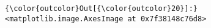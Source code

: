 \documentclass[11pt]{article}
\begin{document}
\begin{Verbatim}[commandchars=\\\{\}]
{\color{outcolor}Out[{\color{outcolor}20}]:} <matplotlib.image.AxesImage at 0x7f38148c76d8>
\end{Verbatim}
            
    \begin{center}
    \end{center}
    { \hspace*{\fill} \\}
    

    
    
    
    
\end{document}
